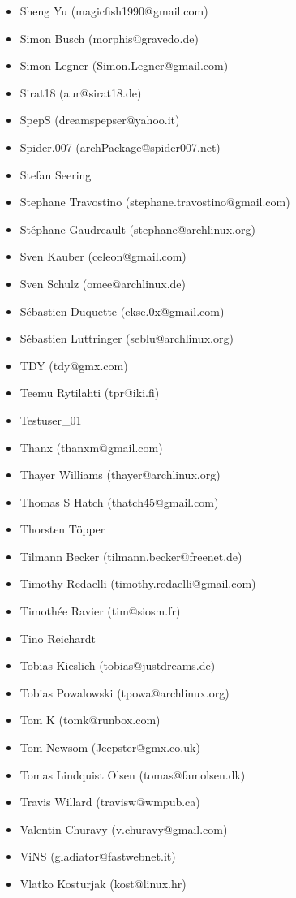 \begin{latin}
\begin{itemize}
\item  Sheng Yu (magicfish1990@gmail.com)
\item  Simon Busch (morphis@gravedo.de)
\item  Simon Legner (Simon.Legner@gmail.com)
\item  Sirat18 (aur@sirat18.de)
\item  SpepS (dreamspepser@yahoo.it)
\item  Spider.007 (archPackage@spider007.net)
\item  Stefan Seering
\item  Stephane Travostino (stephane.travostino@gmail.com)
\item  Stéphane Gaudreault (stephane@archlinux.org)
\item  Sven Kauber (celeon@gmail.com)
\item  Sven Schulz (omee@archlinux.de)
\item  Sébastien Duquette (ekse.0x@gmail.com)
\item  Sébastien Luttringer (seblu@archlinux.org)
\item  TDY (tdy@gmx.com)
\item  Teemu Rytilahti (tpr@iki.fi)
\item  Testuser\_01
\item  Thanx (thanxm@gmail.com)
\item  Thayer Williams (thayer@archlinux.org)
\item  Thomas S Hatch (thatch45@gmail.com)
\item  Thorsten Töpper
\item  Tilmann Becker (tilmann.becker@freenet.de)
\item  Timothy Redaelli (timothy.redaelli@gmail.com)
\item  Timothée Ravier (tim@siosm.fr)
\item  Tino Reichardt
\item  Tobias Kieslich (tobias@justdreams.de)
\item  Tobias Powalowski (tpowa@archlinux.org)
\item  Tom K (tomk@runbox.com)
\item  Tom Newsom (Jeepster@gmx.co.uk)
\item  Tomas Lindquist Olsen (tomas@famolsen.dk)
\item  Travis Willard (travisw@wmpub.ca)
\item  Valentin Churavy (v.churavy@gmail.com)
\item  ViNS (gladiator@fastwebnet.it)
\item  Vlatko Kosturjak (kost@linux.hr)

\end{itemize}
\end{latin}
